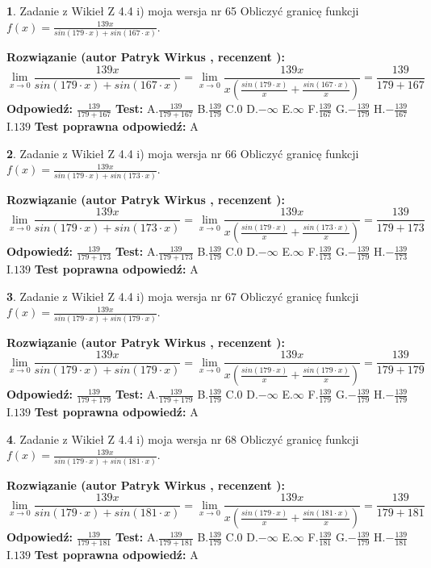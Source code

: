 \documentclass[12pt, a4paper]{article}
\theoremstyle{definition} %
\newtheorem{zad}{}
\newcommand{\zadStart}[1]{\begin{zad}#1\newline}
\newcommand{\zadStop}{\end{zad}}
\newcommand{\rozwStart}[2]{\noindent \textbf{Rozwiązanie (autor #1 , recenzent #2): }\newline}
\newcommand{\rozwStop}{\newline}
\newcommand{\odpStart}{\noindent \textbf{Odpowiedź:}\newline}
\newcommand{\odpStop}{\newline}
\newcommand{\testStart}{\noindent \textbf{Test:}\newline}
\newcommand{\testStop}{\newline}
\newcommand{\kluczStart}{\noindent \textbf{Test poprawna odpowiedź:}\newline}
\newcommand{\kluczStop}{\newline}
\begin{document}
\zadStart{Zadanie z Wikieł Z 4.4 i) moja wersja nr 65}
Obliczyć granicę funkcji $f(x)=\frac{139x}{sin(179\cdot x) +sin(167\cdot x)}$.
\zadStop
\rozwStart{Patryk Wirkus}{}
$$\lim\limits_{x\to 0}\frac{139x}{sin(179\cdot x) +sin(167\cdot x)}=\lim\limits_{x\to 0}\frac{139x}{x(\frac{sin(179\cdot x)}{x}+\frac{sin(167\cdot x)}{x})}=\frac{139}{179+167}$$
\rozwStop
\odpStart
$\frac{139}{179+167}$
\odpStop
\testStart
A.$\frac{139}{179+167}$
B.$\frac{139}{179}$
C.$0$
D.$-\infty$
E.$\infty$
F.$\frac{139}{167}$
G.$-\frac{139}{179}$
H.$-\frac{139}{167}$
I.$139$
\testStop
\kluczStart
A
\kluczStop



\zadStart{Zadanie z Wikieł Z 4.4 i) moja wersja nr 66}
Obliczyć granicę funkcji $f(x)=\frac{139x}{sin(179\cdot x) +sin(173\cdot x)}$.
\zadStop
\rozwStart{Patryk Wirkus}{}
$$\lim\limits_{x\to 0}\frac{139x}{sin(179\cdot x) +sin(173\cdot x)}=\lim\limits_{x\to 0}\frac{139x}{x(\frac{sin(179\cdot x)}{x}+\frac{sin(173\cdot x)}{x})}=\frac{139}{179+173}$$
\rozwStop
\odpStart
$\frac{139}{179+173}$
\odpStop
\testStart
A.$\frac{139}{179+173}$
B.$\frac{139}{179}$
C.$0$
D.$-\infty$
E.$\infty$
F.$\frac{139}{173}$
G.$-\frac{139}{179}$
H.$-\frac{139}{173}$
I.$139$
\testStop
\kluczStart
A
\kluczStop



\zadStart{Zadanie z Wikieł Z 4.4 i) moja wersja nr 67}
Obliczyć granicę funkcji $f(x)=\frac{139x}{sin(179\cdot x) +sin(179\cdot x)}$.
\zadStop
\rozwStart{Patryk Wirkus}{}
$$\lim\limits_{x\to 0}\frac{139x}{sin(179\cdot x) +sin(179\cdot x)}=\lim\limits_{x\to 0}\frac{139x}{x(\frac{sin(179\cdot x)}{x}+\frac{sin(179\cdot x)}{x})}=\frac{139}{179+179}$$
\rozwStop
\odpStart
$\frac{139}{179+179}$
\odpStop
\testStart
A.$\frac{139}{179+179}$
B.$\frac{139}{179}$
C.$0$
D.$-\infty$
E.$\infty$
F.$\frac{139}{179}$
G.$-\frac{139}{179}$
H.$-\frac{139}{179}$
I.$139$
\testStop
\kluczStart
A
\kluczStop



\zadStart{Zadanie z Wikieł Z 4.4 i) moja wersja nr 68}
Obliczyć granicę funkcji $f(x)=\frac{139x}{sin(179\cdot x) +sin(181\cdot x)}$.
\zadStop
\rozwStart{Patryk Wirkus}{}
$$\lim\limits_{x\to 0}\frac{139x}{sin(179\cdot x) +sin(181\cdot x)}=\lim\limits_{x\to 0}\frac{139x}{x(\frac{sin(179\cdot x)}{x}+\frac{sin(181\cdot x)}{x})}=\frac{139}{179+181}$$
\rozwStop
\odpStart
$\frac{139}{179+181}$
\odpStop
\testStart
A.$\frac{139}{179+181}$
B.$\frac{139}{179}$
C.$0$
D.$-\infty$
E.$\infty$
F.$\frac{139}{181}$
G.$-\frac{139}{179}$
H.$-\frac{139}{181}$
I.$139$
\testStop
\kluczStart
A
\kluczStop
\end{document}
